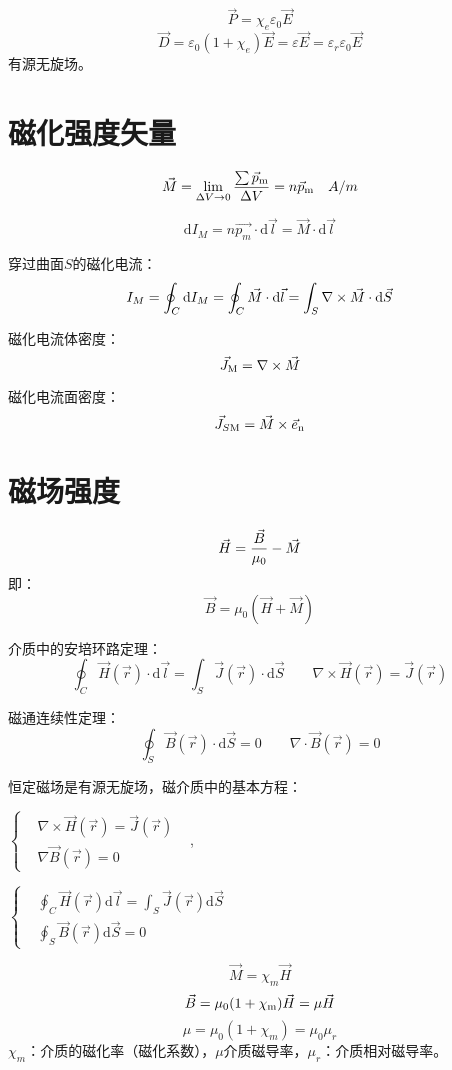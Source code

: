 $$\vec P=\chi_e\varepsilon_0\vec{E}$$
$$\vec D = \varepsilon_0(1 + \chi_e)\vec E = \varepsilon \vec E = \varepsilon_r\varepsilon_0\vec E$$
有源无旋场。

\section{磁化强度矢量}
$$\vec M = \mathop {{\rm{lim}}}\limits_{\Delta V \to 0} {{\sum {{{\vec p}_{\rm{m}}}} } \over {\Delta V}} = n{\vec p_{\rm{m}}}\quad A/m$$

$$\mathrm{d}I_M = n\vec{p_m} \cdot \mathrm{d} \vec{l} = \vec{M} \cdot \mathrm{d}\vec{l}$$

穿过曲面$S$的磁化电流：$${I_M} = \oint_C {{\rm{d}}{I_M}}  = \oint_C {\vec M\cdot{\rm{d}}\vec l}  = \int_S {\nabla  \times \vec M\cdot{\rm{d}}\vec S} $$

磁化电流体密度：$${\vec J_{\rm{M}}} = \nabla  \times \vec M$$

磁化电流面密度：$${\vec J_{S{\rm{M}}}} = \vec M \times {\vec e_{\rm{n}}}$$

\section{磁场强度}
$$\vec H = {{\vec B} \over {{\mu _0}}} - \vec M$$
即：
$$\vec B = {\mu _0}(\vec H + \vec M)$$

介质中的安培环路定理：
$$\oint_C \vec H(\vec r) \cdot \mathrm{d}\vec l  = \int_S \vec J(\vec r) \cdot \mathrm{d}\vec S \qquad \nabla\times\vec{H}(\vec{r})=\vec{J}(\vec{r})$$

磁通连续性定理：
$$\oint_S \vec B(\vec r) \cdot \mathrm{d}\vec S = 0 \qquad \nabla \cdot \vec B(\vec r) = 0$$

恒定磁场是有源无旋场，磁介质中的基本方程：
\begin{center}
	$\left\{ 
	\begin{aligned}
		&\nabla \times \vec{H}(\vec{r}) = \vec{J}(\vec{r})& \\ 
		&\nabla \vec{B}(\vec{r}) = 0&
	\end{aligned}
	\right.$,\qquad
	
	$\left\{ 
	\begin{aligned}
		&\oint_C \vec{H}(\vec{r})\mathrm{d}\vec{l} = \int_S\vec{J}(\vec{r})\mathrm{d}\vec{S}&\\
		&\oint_S \vec{B}(\vec{r})\mathrm{d}\vec{S}  = 0&
	\end{aligned}
	\right.$
\end{center}
$$\vec{M} = \chi_m\vec{H}$$
$$\vec B = {\mu _0}(1 + {\chi _{\rm{m}}}{\rm{)}}\vec H = \mu \vec H$$
$$ \mu = \mu_0(1+\chi_m)=\mu_0\mu_r$$
$\chi_m$：介质的磁化率（磁化系数），$\mu$介质磁导率，$\mu_r$：介质相对磁导率。

